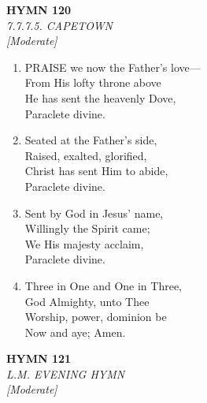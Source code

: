 \newpage
\begin{center}
    {\Large \textbf{HYMN 120}}
    \\
    \textit{7.7.7.5. CAPETOWN}
    \\
    \textit{\small [Moderate]}
\end{center}
\vspace{1em}

\begin{enumerate}
    \item PRAISE we now the Father's love--- \\
        From His lofty throne above \\
        He has sent the heavenly Dove, \\
        Paraclete divine.

    \item Seated at the Father's side, \\
        Raised, exalted, glorified, \\
        Christ has sent Him to abide, \\
        Paraclete divine.

    \item Sent by God in Jesus' name, \\
        Willingly the Spirit came; \\
        We His majesty acclaim, \\
        Paraclete divine.

    \item Three in One and One in Three, \\
        God Almighty, unto Thee \\
        Worship, power, dominion be \\
        Now and aye; Amen.

\end{enumerate}

\newpage
\begin{center}
    {\Large \textbf{HYMN 121}}
    \\
    \textit{L.M. EVENING HYMN}
    \\
    \textit{\small [Moderate]}
\end{center}
\vspace{1em}

